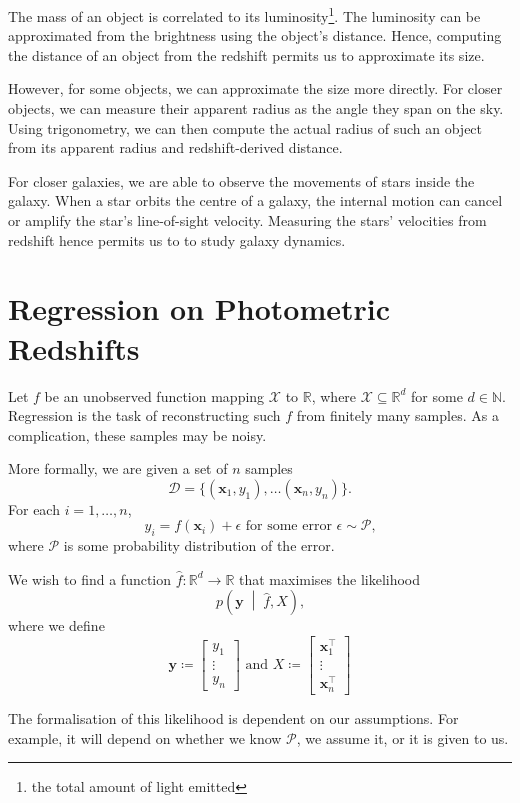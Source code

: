 \documentclass[11pt,twoside]{report}
\newcommand\bx{\mathbf{x}}
\newcommand\by{\mathbf{y}}
\newcommand\bbN{\mathbb{N}}
\newcommand\bbR{\mathbb{R}}
\newcommand\cD{\mathcal{D}}
\newcommand\cP{\mathcal{P}}
\newcommand\cX{\mathcal{X}}
\begin{document}
The mass of an object is correlated to its luminosity\footnote{the total amount of light emitted}. The luminosity can be approximated from the brightness using the object's distance. Hence, computing the distance of an object from the redshift permits us to approximate its size.

However, for some objects, we can approximate the size more directly. For closer objects, we can measure their apparent radius as the angle they span on the sky. Using trigonometry, we can then compute the actual radius of such an object from its apparent radius and redshift-derived distance.

For closer galaxies, we are able to observe the movements of stars inside the galaxy. When a star orbits the centre of a galaxy, the internal motion can cancel or amplify the star's line-of-sight velocity. Measuring the stars' velocities from redshift hence permits us to to study galaxy dynamics.

\chapter{Regression on Photometric Redshifts}
Let $f$ be an unobserved function mapping $\cX$ to $\bbR$, where $\cX \subseteq \bbR^d$ for some $d \in \bbN$. Regression is the task of reconstructing such $f$ from finitely many samples. As a complication, these samples may be noisy.

More formally, we are given a set of $n$ samples\[
    \cD = \{(\bx_1, y_1), \dots (\bx_n, y_n)\} \text{.}
\] For each $i = 1, \dots, n$, \[
    y_i = f(\bx_i) + \epsilon \text{ for some error } \epsilon \sim \cP \text{,}
\] where $\cP$ is some probability distribution of the error.

We wish to find a function $\hat f : \bbR^d \to \bbR$ that maximises the likelihood \[
    p\left(\by \;\middle|\; \hat f, X\right) \text{,}
\] where we define\[
    \by \coloneqq \begin{bmatrix} y_1 \\ \vdots \\ y_n \end{bmatrix}
    \text{ and }
    X \coloneqq \begin{bmatrix} \bx_1^\intercal \\ \vdots \\ \bx_n^\intercal \end{bmatrix}
\]

The formalisation of this likelihood is dependent on our assumptions. For example, it will depend on whether we know $\cP$, we assume it, or it is given to us.
\end{document}
